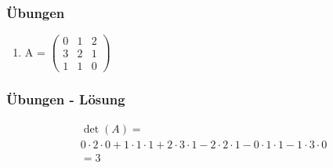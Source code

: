 \begin{frame}
	\frametitle{Übungen}
	\begin{enumerate}
	\item A = $\begin{pmatrix}
	0 & 1 & 2 \\
	3 & 2 & 1 \\
	1 & 1 & 0
	\end{pmatrix}$
	\end{enumerate}
\end{frame}

\begin{frame}
	\frametitle{Übungen - Lösung}
	\begin{gather*}
	 \det(A) =  \\
	 0 \cdot 2 \cdot 0 
	 + 1 \cdot 1 \cdot 1 
	 + 2 \cdot 3 \cdot 1
	 - 2 \cdot 2 \cdot 1
	 - 0 \cdot 1 \cdot 1
	 - 1 \cdot 3 \cdot 0 \\
	 = 3
	\end{gather*}
\end{frame}


